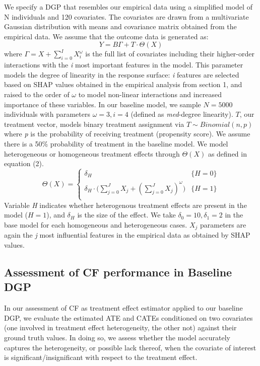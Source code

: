 \documentclass[12pt]{article}
\begin{document}
We specify a DGP that resembles our empirical data using a simplified model of N individuals and 120 covariates. The covariates are drawn from a multivariate Gaussian distribution with means and covariance matrix obtained from the empirical data. We assume that the outcome data is generated as: 
\[ Y = B \Gamma + T  \cdot \Theta(X) \tag{1} \label{eq:special}\]
where $\Gamma = X + \sum_{i = 0}^{I} X_i^\omega$ is the full list of covariates including their higher-order interactions with the \textit{i} most important features in the model. This parameter models the degree of linearity in the response surface: \textit{i} features are selected based on SHAP values obtained in the empirical analysis from section 1, and raised to the order of $\omega$ to model non-linear interactions and increased importance of these variables. In our baseline model, we sample $N=5000$ individuals with parameters $\omega = 3, i = 4$ (defined as \textit{med}-degree linearity). $T$, our treatment vector, models binary treatment assignment via $ T \sim Binomial(n,p)$ where \textit{p} is the probability of receiving treatment (propensity score). We assume there is a 50\% probability of treatment in the baseline model. We model heterogeneous or homogeneous treatment effects through $\Theta(X)$ as defined in equation (2). 
\[
\Theta(X) =  \begin{cases} 
	 \delta_H & {\{H = 0\}} \\ 
	 \delta_H \cdot \big( \sum_{j = 0}^{J} X_j + (\sum_{j = 0}^{J} X_j )^\omega ) & \{ H = 1 \} \\ 
\end{cases} \tag{2} \label{eq:special} \]
Variable \textit{H} indicates whether heterogenous treatment effects are present in the model ($H = 1$), and $\delta_H$ is the size of the effect. We take $\delta_0 = 10, \delta_1 = 2$ in the base model for each homogeneous and heterogeneous cases. $X_j$ parameters are again the \textit{j} most influential features in the empirical data as obtained by SHAP values. \\

\subsection{Assessment of CF performance in Baseline DGP} 

In our assessment of CF as treatment effect estimator applied to our baseline
DGP, we evaluate the estimated ATE and CATEs conditioned on two covariates (one
involved in treatment effect heterogeneity, the other not) against their ground
truth values. In doing so, we assess whether the model accurately captures the
heterogeneity, or possible lack thereof, when the covariate of interest is
significant/insignificant with respect to the treatment effect. 
\end{document}
